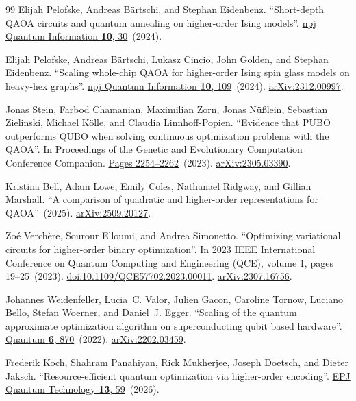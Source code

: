 \documentclass[a4paper,onecolumn,11pt,unpublished]{quantumarticle}
\theoremstyle{remark}
\begin{document}
\begin{thebibliography}{99}
Elijah Pelofske, Andreas B{\"a}rtschi, and Stephan Eidenbenz.
\newblock ``Short-depth QAOA circuits and quantum annealing on higher-order Ising models''.
\newblock \href{https://dx.doi.org/10.1038/s41534-024-00825-w}{npj Quantum Information {\bf 10}, 30}~(2024).

Elijah Pelofske, Andreas B{\"a}rtschi, Lukasz Cincio, John Golden, and Stephan Eidenbenz.
\newblock ``Scaling whole-chip QAOA for higher-order Ising spin glass models on heavy-hex graphs''.
\newblock \href{https://dx.doi.org/10.1038/s41534-024-00906-w}{npj Quantum Information {\bf 10}, 109}~(2024).
\newblock \href{http://arxiv.org/abs/2312.00997}{arXiv:2312.00997}.

Jonas Stein, Farbod Chamanian, Maximilian Zorn, Jonas N{\"u}{\ss}lein, Sebastian Zielinski, Michael K{\"o}lle, and Claudia Linnhoff-Popien.
\newblock ``Evidence that PUBO outperforms QUBO when solving continuous optimization problems with the QAOA''.
\newblock In Proceedings of the Genetic and Evolutionary Computation Conference Companion.
\newblock \href{https://dx.doi.org/10.1145/3583133.3596358}{Pages 2254--2262}~(2023).
\newblock \href{http://arxiv.org/abs/2305.03390}{arXiv:2305.03390}.

Kristina Bell, Adam Lowe, Emily Coles, Nathanael Ridgway, and Gillian Marshall.
\newblock ``A comparison of quadratic and higher-order representations for QAOA''~(2025).
\newblock \href{http://arxiv.org/abs/2509.20127}{arXiv:2509.20127}.

Zo{\'e} Verch{\`e}re, Sourour Elloumi, and Andrea Simonetto.
\newblock ``Optimizing variational circuits for higher-order binary optimization''.
\newblock In 2023 IEEE International Conference on Quantum Computing and Engineering (QCE), volume 1, pages 19--25~(2023).
\newblock \href{https://dx.doi.org/10.1109/QCE57702.2023.00011}{doi:10.1109/QCE57702.2023.00011}.
\newblock \href{http://arxiv.org/abs/2307.16756}{arXiv:2307.16756}.

Johannes Weidenfeller, Lucia~C. Valor, Julien Gacon, Caroline Tornow, Luciano Bello, Stefan Woerner, and Daniel~J. Egger.
\newblock ``Scaling of the quantum approximate optimization algorithm on superconducting qubit based hardware''.
\newblock \href{https://dx.doi.org/10.22331/q-2022-12-07-870}{Quantum {\bf 6}, 870}~(2022).
\newblock \href{http://arxiv.org/abs/2202.03459}{arXiv:2202.03459}.

Frederik Koch, Shahram Panahiyan, Rick Mukherjee, Joseph Doetsch, and Dieter Jaksch.
\newblock ``Resource-efficient quantum optimization via higher-order encoding''.
\newblock \href{https://dx.doi.org/10.1140/epjqt/s40507-026-00526-7}{EPJ Quantum Technology {\bf 13}, 59}~(2026).


\end{thebibliography}
\end{document}
